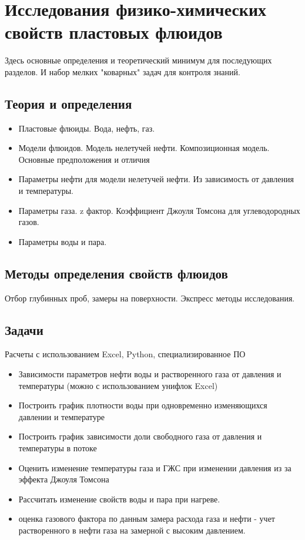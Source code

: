 \section{Исследования физико-химических свойств пластовых флюидов}

Здесь основные определения и теоретический минимум для последующих разделов. 
И набор мелких "коварных" задач для контроля знаний.
\subsection{Теория и определения}
\begin{itemize}
    \item Пластовые флюиды. Вода, нефть, газ.
    \item Модели флюидов. Модель нелетучей нефти. Композиционная модель. Основные предположения и отличия
    \item Параметры нефти для модели нелетучей нефти. Из зависимость от давления и температуры. 
    \item Параметры газа. z фактор. Коэффициент Джоуля Томсона для углеводородных газов. 
    \item Параметры воды и пара.
    
\end{itemize}
\subsection{Методы определения свойств флюидов}
Отбор глубинных проб, замеры на поверхности. Экспресс методы исследования.
\subsection{Задачи}
Расчеты с использованием Excel, Python, специализированное ПО
\begin{itemize}
    \item Зависимости параметров нефти воды и растворенного газа от давления и температуры (можно с использованием унифлок Excel)
    \item Построить график плотности воды при одновременно изменяющихся давлении и температуре
    \item Построить график зависимости доли свободного газа  от давления и температуры в потоке
    \item Оценить изменение температуры газа и ГЖС при изменении давления из за эффекта Джоуля Томсона
    \item Рассчитать изменение свойств воды и пара при нагреве.
    \item оценка газового фактора по данным замера расхода газа и нефти - учет растворенного в нефти газа на замерной с высоким давлением.

\end{itemize}
    